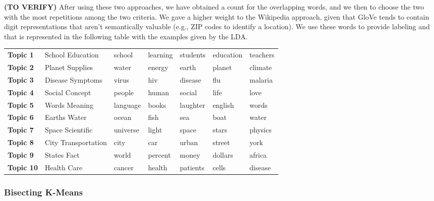 \documentclass[letterpaper, 11pt]{article}
\begin{document}
\textbf{(TO VERIFY)} After using these two approaches, we have obtained a count for the overlapping words, and we then to choose the two with the most repetitions among the two criteria. We gave a higher weight to the Wikipedia approach, given that GloVe tends to contain digit representations that aren't semantically valuable (e.g., ZIP codes to identify a location). We use these words to provide labeling and that is represented in the following table with the examples given by the LDA.

\medskip
\begin{minipage}{\linewidth}
\centering
{} \label{tab:title}
\begin{tabular}{lllllll}
\toprule
\bf{Topic 1}  & School Education &    school &     learning &      students &  education &   teachers \\
\bf{Topic 2}  & Planet Supplies &     water &    energy &        earth &        planet &    climate  \\
\bf{Topic 3}  & Disease Symptoms &     virus &       hiv &      disease &           flu &    malaria  \\
\bf{Topic 4}  & Social Concept &    people &     human &       social &          life &       love  \\
\bf{Topic 5}  & Words Meaning &  language &     books &     laughter &       english &       words \\
\bf{Topic 6}  & Earths Water &     ocean &      fish &          sea &          boat &       water \\
\bf{Topic 7}  & Space Scientific &  universe &     light &        space &         stars &     physics \\
\bf{Topic 8}  & City Transportation &       city &       car &         urban &       street &       york  \\
\bf{Topic 9}  & States Fact &      world &   percent &         money &      dollars &     africa  \\
\bf{Topic 10} & Health Care &    cancer &    health &     patients &         cells &    disease  \\
\bottomrule
\end{tabular}\par
\medskip
\end{minipage}
\subsubsection{Bisecting K-Means}\label{bisecting-k-means}
\end{document}
